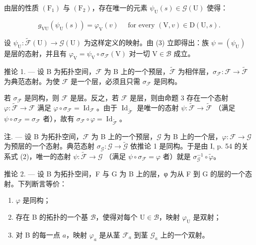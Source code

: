 由层的性质 \((\mathrm{F}_{1})\) 与 \((\mathrm{F}_{2})\)，存在唯一的元素 \(\psi_{\mathrm{U}}(s) \in \mathcal{G}(\mathrm{U})\) 使得：

\[
g _ {\mathrm{VU}} \left(\psi_ {\mathrm{U}} (s)\right) = \varphi_ {\mathrm{V}} (v) \quad \text {   for   every   } (\mathrm{V}, v) \in \mathrm{D} (\mathrm{U}, s).\tag{3}
\]

设 \(\psi_{\mathrm{U}}\colon \widetilde{\mathcal{F}} (\mathrm{U})\to \mathcal{G}(\mathrm{U})\) 为这样定义的映射。由 (3) 立即得出：族 \(\psi = (\psi_{\mathrm{U}})\) 是层的态射，并且有 \(\varphi_{\mathrm{V}} = \psi_{\mathrm{V}}\circ \sigma_{\mathcal{F}}(\mathrm{V})\) 对一切 \(\mathrm{V}\in \mathcal{B}\) 成立。

推论 1. --- 设 B 为拓扑空间，\(\mathcal{F}\) 为 B 上的一个预层，\(\widetilde{\mathcal{F}}\) 为相伴层，\(\sigma_{\mathcal{F}}\colon \mathcal{F} \to \widetilde{\mathcal{F}}\) 为典范态射。为使 \(\mathcal{F}\) 是一个层，必须且只需 \(\sigma_{\mathcal{F}}\) 是同构。

若 \(\sigma_{\mathcal{F}}\) 是同构，则 \(\mathcal{F}\) 是层。反之，若 \(\mathcal{F}\) 是层，则由命题 3 存在一个态射 \(\varphi: \widetilde{\mathcal{F}} \to \mathcal{F}\) 满足 \(\varphi \circ \sigma_{\mathcal{F}} = \operatorname{Id}_{\mathcal{F}}\)。由于 \(\operatorname{Id}_{\widetilde{\mathcal{F}}}\) 是唯一的态射 \(\psi: \widetilde{\mathcal{F}} \to \widetilde{\mathcal{F}}\) （满足 \(\psi \circ \sigma_{\mathcal{F}} = \sigma_{\mathcal{F}}\) 者），故有 \(\sigma_{\mathcal{F}} \circ \varphi = \operatorname{Id}_{\widetilde{\mathcal{F}}}\)。

注. --- 设 B 为拓扑空间，\(\mathcal{F}\) 为 B 上的一个预层，\(\mathcal{G}\) 为 B 上的一个层，\(\varphi\colon\mathcal{F}\to\mathcal{G}\) 为预层的一个态射。典范态射 \(\sigma_{\mathcal{G}}\colon\mathcal{G}\to\widetilde{\mathcal{G}}\) 依推论 1 是同构。于是由 I, p. 54 的关系式 (2)，唯一的态射 \(\psi\colon\widetilde{\mathcal{F}}\to\mathcal{G}\) （满足 \(\psi\circ\sigma_{\mathcal{F}}=\varphi\) 者）就是 \(\sigma_{\mathcal{G}}^{-1}\circ\widetilde{\varphi}\)。

推论 2. --- 设 B 为拓扑空间，F 与 G 为 B 上的层，φ 为从 F 到 G 的层的一个态射。下列断言等价：

\begin{enumerate}
\def\labelenumi{(\roman{enumi})}
\item
  \(\varphi\) 是同构；
\item
  存在 B 的拓扑的一个基 \(\mathcal{B}\)，使得对每个 \(\mathrm{U} \in \mathcal{B}\)，映射 \(\varphi_{\mathrm{U}}\) 是双射；
\item
  对 B 的每一点 \(a\)，映射 \(\varphi_{a}\) 是从茎 \(\mathcal{F}_{a}\) 到茎 \(\mathcal{G}_{a}\) 上的一个双射。
\end{enumerate}

